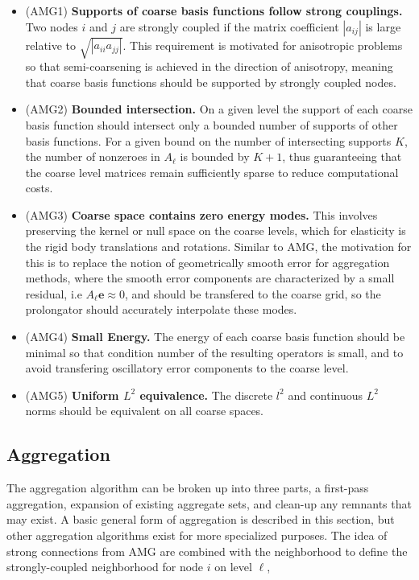 \begin{itemize}
	\item (AMG1) \textbf{Supports of coarse basis functions follow strong couplings.} Two nodes $i$ and $j$ are strongly coupled if the matrix coefficient $|a_{ij}|$ is large relative to $\sqrt{|a_{ii}a_{jj}|}$. This requirement is motivated for anisotropic problems so that semi-coarsening is achieved in the direction of anisotropy, meaning that coarse basis functions should be supported by strongly coupled nodes.
	\item (AMG2) \textbf{Bounded intersection.} On a given level the support of each coarse basis function should intersect only a bounded number of supports of other basis functions. For a given bound on the number of intersecting supports $K$, the number of nonzeroes in $A_\ell$ is bounded by $K+1$, thus guaranteeing that the coarse level matrices remain sufficiently sparse to reduce computational costs.
	\item (AMG3) \textbf{Coarse space contains zero energy modes.} This involves preserving the kernel or null space on the coarse levels, which for elasticity is the rigid body translations and rotations. Similar to AMG, the motivation for this is to replace the notion of geometrically smooth error for aggregation methods, where the smooth error components are characterized by a small residual, i.e $A_\ell\mathbf{e} \approx 0$, and should be transfered to the coarse grid, so the prolongator should accurately interpolate these modes.
	\item (AMG4) \textbf{Small Energy.} The energy of each coarse basis function should be minimal so that condition number of the resulting operators is small, and to avoid transfering oscillatory error components to the coarse level. %
	\item (AMG5) \textbf{Uniform $L^2$ equivalence.} The discrete $l^2$ and continuous $L^2$ norms should be equivalent on all coarse spaces.
\end{itemize}

\subsection{Aggregation}
The aggregation algorithm can be broken up into three parts, a first-pass aggregation, expansion of existing aggregate sets, and clean-up any remnants that may exist. A basic general form of aggregation is described in this section, but other aggregation algorithms exist for more specialized purposes. The idea of strong connections from AMG are combined with the neighborhood to define the strongly-coupled neighborhood for node $i$ on level $\ell$,

